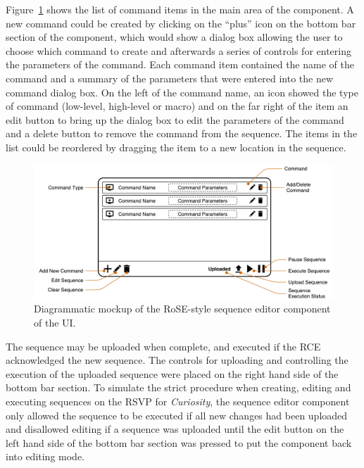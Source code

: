         Figure~\ref{fig:softDesign-sequenceEditorUIComponentDesign} shows the list of command items in the main area of the component. A new command could be created by clicking on the ``plus'' icon on the bottom bar section of the component, which would show a dialog box allowing the user to choose which command to create and afterwards a series of controls for entering the parameters of the command. Each command item contained the name of the command and a summary of the parameters that were entered into the new command dialog box. On the left of the command name, an icon showed the type of command (low-level, high-level or macro) and on the far right of the item an edit button to bring up the dialog box to edit the parameters of the command and a delete button to remove the command from the sequence. The items in the list could be reordered by dragging the item to a new location in the sequence.
        
        \begin{figure}[h!]
          \centering
          \includegraphics[width=1\linewidth]{figures/softDesign-sequenceEditorUIComponentDesign}
          \caption[Diagrammatic mockup of the RoSE-style sequence editor component of the UI.]{Diagrammatic mockup of the RoSE-style sequence editor component of the UI.}
          \label{fig:softDesign-sequenceEditorUIComponentDesign}
        \end{figure}        
        
        The sequence may be uploaded when complete, and executed if the RCE acknowledged the new sequence. The controls for uploading and controlling the execution of the uploaded sequence were placed on the right hand side of the bottom bar section. To simulate the strict procedure when creating, editing and executing sequences on the RSVP for \textit{Curiosity}, the sequence editor component only allowed the sequence to be executed if all new changes had been uploaded and disallowed editing if a sequence was uploaded until the edit button on the left hand side of the bottom bar section was pressed to put the component back into editing mode.
        
